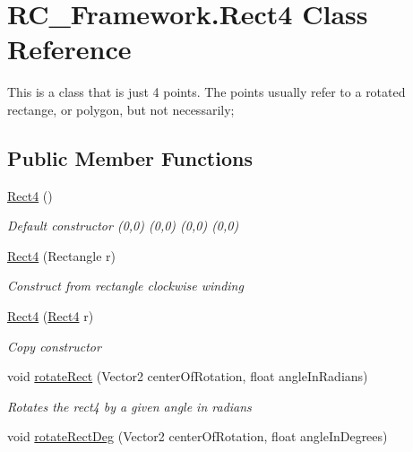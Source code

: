 \hypertarget{class_r_c___framework_1_1_rect4}{}\section{R\+C\+\_\+\+Framework.\+Rect4 Class Reference}
\label{class_r_c___framework_1_1_rect4}


This is a class that is just 4 points. The points usually refer to a rotated rectange, or polygon, but not necessarily;  


\subsection*{Public Member Functions}
\begin{DoxyCompactItemize}
\item 
\mbox{\hyperlink{class_r_c___framework_1_1_rect4_af2a81f571eade3c6ff1ddf0c7197dbc0}{Rect4}} ()
\begin{DoxyCompactList}\small\item\em Default constructor (0,0) (0,0) (0,0) (0,0)\end{DoxyCompactList}\item 
\mbox{\hyperlink{class_r_c___framework_1_1_rect4_a286c81d43d843dd2ac8063c0966ad131}{Rect4}} (Rectangle r)
\begin{DoxyCompactList}\small\item\em Construct from rectangle clockwise winding\end{DoxyCompactList}\item 
\mbox{\hyperlink{class_r_c___framework_1_1_rect4_a6a3bcaf8e407350de7e6f86ee41545bb}{Rect4}} (\mbox{\hyperlink{class_r_c___framework_1_1_rect4}{Rect4}} r)
\begin{DoxyCompactList}\small\item\em Copy constructor \end{DoxyCompactList}\item 
void \mbox{\hyperlink{class_r_c___framework_1_1_rect4_a49f1034230108e0d7f67e0e5c23d7571}{rotate\+Rect}} (Vector2 center\+Of\+Rotation, float angle\+In\+Radians)
\begin{DoxyCompactList}\small\item\em Rotates the rect4 by a given angle in radians \end{DoxyCompactList}\item 
void \mbox{\hyperlink{class_r_c___framework_1_1_rect4_ae4d7fe5f04693972d0bf7ccb12b33569}{rotate\+Rect\+Deg}} (Vector2 center\+Of\+Rotation, float angle\+In\+Degrees)

\end{DoxyCompactItemize}
